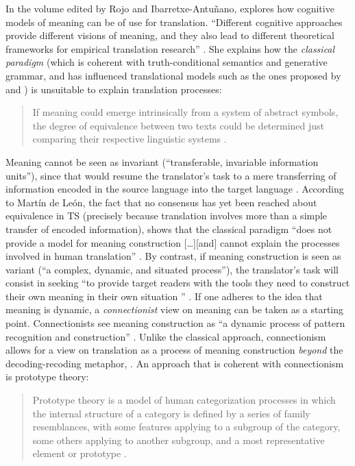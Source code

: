 In the volume edited by Rojo and Ibarretxe-Antuñano, \citet{rojo_who_2013} explores how cognitive models of meaning can be of use for translation. “Different cognitive approaches provide different visions of meaning, and they also lead to different theoretical frameworks for empirical translation research” \citep[99]{rojo_who_2013}. She explains how the \textit{classical} \textit{paradigm} (which is coherent with truth-conditional semantics and generative grammar, and has influenced translational models such as the ones proposed by \citet{nida_toward_1964} and \citet{kade_zufall_1968}) is unsuitable to explain translation processes:

\begin{quote}
If meaning could emerge intrinsically from a system of abstract symbols, the degree of equivalence between two texts could be determined just comparing their respective linguistic systems \citep[103]{rojo_who_2013}.
\end{quote}

Meaning cannot be seen as invariant (“transferable, invariable information units”), since that would resume the translator’s task to a mere transferring of information encoded in the source language into the target language \citep[99]{rojo_who_2013}. According to Martín de León, the fact that no consensus has yet been reached about equivalence in TS (precisely because translation involves more than a simple transfer of encoded information), shows that the classical paradigm “does not provide a model for meaning construction […][and] cannot explain the processes involved in human translation” \citep[103]{rojo_who_2013}. By contrast, if meaning construction is seen as variant (“a complex, dynamic, and situated process”), the translator’s task will consist in seeking “to provide target readers with the tools they need to construct their own meaning in their own situation \citep{risku_translationsmanagement._2004}” \citep[99]{rojo_who_2013}. If one adheres to the idea that meaning is dynamic, a \textit{connectionist} view on meaning can be taken as a starting point. Connectionists see meaning construction as “a dynamic process of pattern recognition and construction” \citep[100]{rojo_who_2013}. Unlike the classical approach, connectionism allows for a view on translation as a process of meaning construction \textit{beyond} the decoding-recoding metaphor, \citep[105]{rojo_who_2013}. An approach that is coherent with connectionism is prototype theory:

\begin{quote}
Prototype theory is a model of human categorization processes in which the internal structure of a category is defined by a series of family resemblances, with some features applying to a subgroup of the category, some others applying to another subgroup, and a most representative element or prototype \citep[106]{rojo_who_2013}.
\end{quote}

